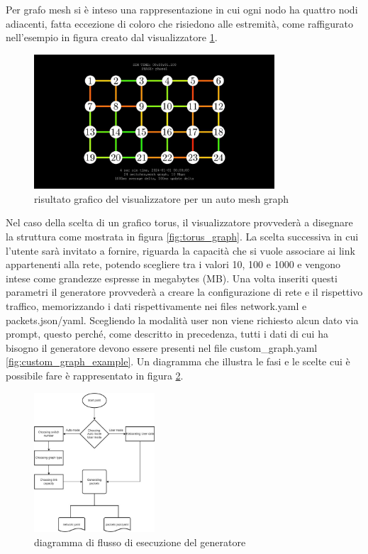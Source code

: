 \documentclass[binding=0.6cm]{sapthesis}
\begin{document}
Per grafo mesh si è inteso una rappresentazione in cui ogni nodo ha quattro nodi adiacenti, fatta eccezione di coloro che risiedono alle estremità, come
raffigurato nell'esempio in figura creato dal visualizzatore \ref{fig:mesh_example}.
\begin{figure}[h]
    \centering
    \includegraphics[width=0.8\textwidth]{immagini/mesh_example.jpg}
    \caption{risultato grafico del visualizzatore per un auto mesh graph}
    \label{fig:mesh_example}
\end{figure}
Nel caso della scelta di un grafico torus, il visualizzatore provvederà a disegnare la struttura come mostrata in figura \ref{fig:torus_graph}.
La scelta successiva in cui l'utente sarà invitato a fornire, riguarda la capacità che si vuole associare ai link appartenenti alla rete, potendo
scegliere tra i valori 10, 100 e 1000 e vengono intese come grandezze espresse in megabytes (MB).
Una volta inseriti questi parametri il generatore provvederà a creare la configurazione di rete e il rispettivo traffico, memorizzando i dati rispettivamente
nei files network.yaml e packets.json/yaml.
Scegliendo la modalità user non viene richiesto alcun dato via prompt, questo perché, come descritto in precedenza, tutti i dati di cui ha bisogno
il generatore devono essere presenti nel file custom\_graph.yaml \ref{fig:custom_graph_example}. Un diagramma che illustra le fasi e le
 scelte cui è possibile fare
è rappresentato in figura \ref{fig:diagramma_generatore}.   
\begin{figure}[h]
    \centering
    \includegraphics[width=0.40\textwidth]{immagini/diagramma_selezioni_config_gen.jpg}
    \caption{diagramma di flusso di esecuzione del generatore}
    \label{fig:diagramma_generatore}
\end{figure}
\end{document}
